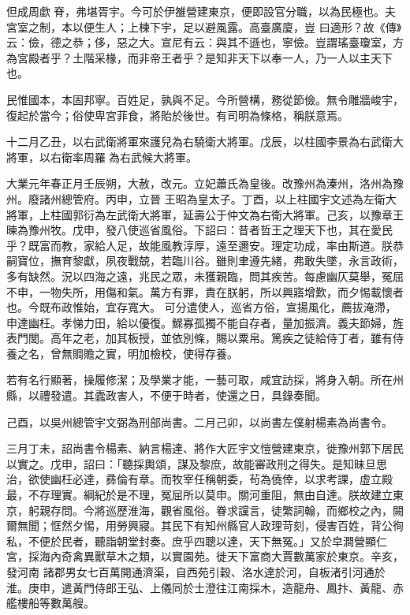 \begin{pinyinscope}
 但成周歔脊，弗堪胥宇。今可於伊雒營建東京，便即設官分職，以為民極也。夫宮室之制，本以便生人；上棟下宇，足以避風露。高臺廣廈，豈
 曰適形？故《傳》云：儉，德之恭；侈，惡之大。宣尼有云：與其不遜也，寧儉。豈謂瑤臺瓊室，方為宮殿者乎？土階采椽，而非帝王者乎？是知非天下以奉一人，乃一人以主天下也。



 民惟國本，本固邦寧。百姓足，孰與不足。今所營構，務從節儉。無令雕牆峻宇，復起於當今；俗使卑宮菲食，將貽於後世。有司明為條格，稱朕意焉。



 十二月乙丑，以右武衛將軍來護兒為右驍衛大將軍。戊辰，以柱國李景為右武衛大將軍，以右衛率周羅為右武候大將軍。



 大業元年春正月壬辰朔，大赦，改元。立妃蕭氏為皇後。改豫州為溱州，洛州為豫州。廢諸州總管府。丙申，立晉
 王昭為皇太子。丁酉，以上柱國宇文述為左衛大將軍，上柱國郭衍為左武衛大將軍，延壽公于仲文為右衛大將軍。己亥，以豫章王暕為豫州牧。戊申，發八使巡省風俗。下詔曰：昔者哲王之理天下也，其在愛民乎？既富而教，家給人足，故能風教淳厚，遠至邇安。理定功成，率由斯道。朕恭嗣寶位，撫育黎獻，夙夜戰兢，若臨川谷。雖則聿遵先緒，弗敢失墜，永言政術，多有缺然。況以四海之遠，兆民之眾，未獲親臨，問其疾苦。每慮幽仄莫舉，冤屈不申，一物失所，用傷和氣。萬方有罪，責在朕躬，所以興寤增歎，而夕惕載懷者也。今既布政惟始，宜存寬大。
 可分遣使人，巡省方俗，宣揚風化，薦拔淹滯，申達幽枉。孝悌力田，給以優復。鰥寡孤獨不能自存者，量加振濟。義夫節婦，旌表門閭。高年之老，加其板授，並依別條，賜以粟帛。篤疾之徒給侍丁者，雖有侍養之名，曾無賙贍之實，明加檢校，使得存養。



 若有名行顯著，操履修潔；及學業才能，一藝可取，咸宜訪採，將身入朝。所在州縣，以禮發遣。其蠹政害人，不便于時者，使還之日，具錄奏聞。



 己酉，以吳州總管宇文弼為刑部尚書。二月己卯，以尚書左僕射楊素為尚書令。



 三月丁未，詔尚書令楊素、納言楊達、將作大匠宇文愷營建東京，徙豫州郭下居民
 以實之。戊申，詔曰：「聽採輿頌，謀及黎庶，故能審政刑之得失。是知昧旦思治，欲使幽枉必達，彞倫有章。而牧宰任稱朝委，茍為僥倖，以求考課，虛立殿最，不存理實。綱紀於是不理，冤屈所以莫申。關河重阻，無由自達。朕故建立東京，躬親存問。今將巡歷淮海，觀省風俗。眷求讜言，徒繁詞翰，而鄉校之內，闕爾無聞；恇然夕惕，用勞興寢。其民下有知州縣官人政理苛刻，侵害百姓，背公徇私，不便於民者，聽詣朝堂封奏。庶乎四聰以達，天下無冤。」又於皁澗營顯仁宮，採海內奇禽異獸草木之類，以實園苑。徙天下富商大賈數萬家於東京。辛亥，發河南
 諸郡男女七百萬開通濟渠，自西苑引穀、洛水達於河，自板渚引河通於淮。庚申，遣黃門侍郎王弘、上儀同於士澄往江南採木，造龍舟、鳳抃、黃龍、赤艦樓船等數萬艘。




\end{pinyinscope}
